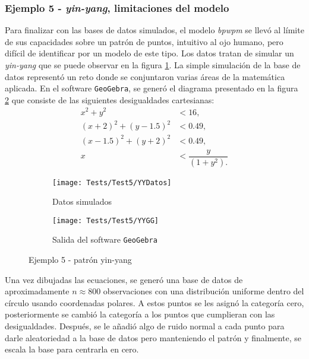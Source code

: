 \documentclass[../Main/Main.tex]{subfiles}
\begin{document}
\subsubsection*{Ejemplo 5 - \textit{yin-yang}, limitaciones del modelo}
Para finalizar con las bases de datos simulados, el modelo \textit{bpwpm} se llevó al límite de sus capacidades sobre un patrón de puntos, intuitivo al ojo humano, pero difícil de identificar por un modelo de este tipo. Los datos tratan de simular un \textit{yin-yang} que se puede observar en la figura \ref{fig:YYDatos}. La simple simulación de la base de datos representó un reto donde se conjuntaron varias áreas de la matemática aplicada. En el software \verb|GeoGebra|, se generó el diagrama presentado en la figura \ref{fig:YYGG} que consiste de las siguientes desigualdades cartesianas:
\begin{align*}
	x^2 + y^2 &< 16, \\
	(x+2)^2 + (y-1.5)^2 &< 0.49, \\
	(x-1.5)^2 + (y+2)^2 &< 0.49, \\[4pt]
	x &< \dfrac{y}{(1+y^2).}
\end{align*}

\begin{figure}[h]
        \centering
        \begin{subfigure}[t]{0.45\textwidth}
            \centering
            \texttt{[image: Tests/Test5/YYDatos]}
            \caption{Datos simulados}   
            \label{fig:YYDatos}
        \end{subfigure}
        \hfill
        \begin{subfigure}[t]{0.45\textwidth}  
            \centering 
            \texttt{[image: Tests/Test5/YYGG]}
            \caption{Salida del software \texttt{GeoGebra}}
            \label{fig:YYGG}
        \end{subfigure}
        \caption{Ejemplo 5 - patrón yin-yang}
        \label{fig:YYInitialPlots}
\end{figure}
Una vez dibujadas las ecuaciones, se generó una base de datos de aproximadamente $n \approx \num{800}$ observaciones con una distribución uniforme dentro del círculo usando coordenadas polares. A estos puntos se les asignó la categoría cero, posteriormente se cambió la categoría a los puntos que cumplieran con las desigualdades. Después, se le añadió algo de ruido normal a cada punto para darle aleatoriedad a la base de datos pero manteniendo el patrón y finalmente, se escala la base para centrarla en cero.  
\end{document}

